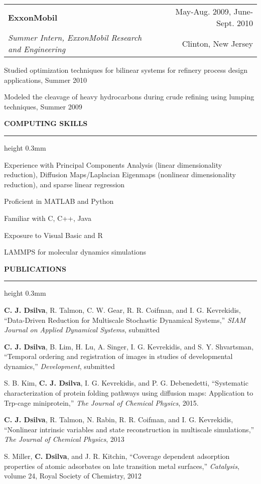 \documentclass[letterpaper,10pt]{article}
\makeatletter
\newenvironment{itemize*}
  {\begin{itemize}
    \setlength{\parskip}{-2pt}}
  {\end{itemize}}
\newcommand{\cvheading}[1]{
\vspace{0.11in}
\noindent
\MakeUppercase{\bf #1}
\vspace{0.05in}
{\hrule height 0.3mm}
\vspace{0.05in}}
\newcommand{\workplace}[4]{
\noindent
\vspace{0.011in}
\begin{tabular*}{1.0\textwidth}{@{\extracolsep{\fill}} l r}
{\bf #1} & #2\\
{\em #3} & #4\\
\end{tabular*}
\vspace{-0.14in}
}
\makeatother
\begin{document}
\workplace{ExxonMobil}{May-Aug. 2009, June-Sept. 2010}{Summer Intern, ExxonMobil Research and Engineering}{Clinton, New Jersey}
\begin{itemize*}
\item Studied optimization techniques for bilinear systems for refinery process design applications, Summer 2010
\item Modeled the cleavage of heavy hydrocarbons during crude refining using lumping techniques, Summer 2009
\end{itemize*}

\cvheading{Computing Skills}
\begin{itemize*}
\item Experience with Principal Components Analysis (linear dimensionality reduction), Diffusion Maps/Laplacian Eigenmaps (nonlinear dimensionality reduction), and sparse linear regression
\item Proficient in MATLAB and Python
\item Familiar with C, C++, Java
\item Exposure to Visual Basic and R
\item LAMMPS for molecular dynamics simulations
\end{itemize*}

\newpage

\cvheading{Publications}
\begin{itemize*}
\item {\bf C. J. Dsilva}, R. Talmon, C. W. Gear, R. R. Coifman, and I. G. Kevrekidis, ``Data-Driven Reduction for Multiscale Stochastic Dynamical Systems,'' {\em SIAM Journal on Applied Dynamical Systems}, submitted
\item {\bf C. J. Dsilva}, B. Lim, H. Lu, A. Singer, I. G. Kevrekidis, and S. Y. Shvartsman, ``Temporal ordering and registration of images in studies of developmental dynamics,'' {\em Development}, submitted
\item S. B. Kim, {\bf C. J. Dsilva}, I. G. Kevrekidis, and P. G. Debenedetti, ``Systematic characterization of protein folding pathways using diffusion maps: Application to Trp-cage miniprotein,'' {\em The Journal of Chemical Physics}, 2015. 
\item {\bf C. J. Dsilva}, R. Talmon, N. Rabin, R. R. Coifman, and I. G. Kevrekidis, ``Nonlinear intrinsic variables and state reconstruction in multiscale simulations,''
{\em The Journal of Chemical Physics}, 2013
\item S. Miller, {\bf C. Dsilva}, and J. R. Kitchin, ``Coverage dependent adsorption properties of atomic adsorbates on late transition metal surfaces,'' {\em Catalysis}, volume 24, Royal Society of Chemistry, 2012
\end{itemize*}
\end{document}
